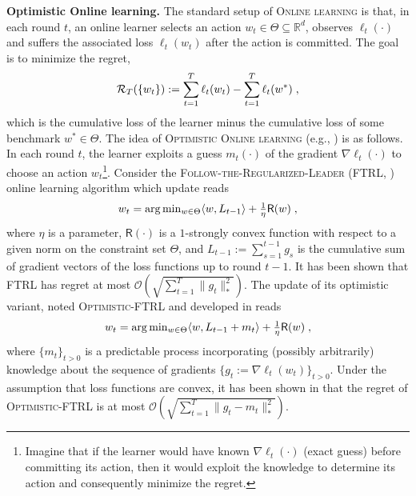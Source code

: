 \documentclass[twoside]{article}
\begin{document}
\textbf{Optimistic Online learning.}\hspace{0.1cm}
The standard setup of \textsc{Online learning} is that, in each round $t$, an online learner selects an action $w_{t} \in \Theta \subseteq \mathbb R^{d}$, observes $\ell_{t}(\cdot)$ and suffers the associated loss $\ell_{t}(w_t)$ after the action is committed.
The goal is to minimize the regret, 
$$\mathcal{R}_{T}( \{ w_t \} ):= \sum_{t=1}^T \ell_{t}(w_t) - \sum_{t=1}^T \ell_{t}(w^*)\;,$$
which is the cumulative loss of the learner minus the cumulative loss of some benchmark $w^{*} \in \Theta$.
The idea of \textsc{Optimistic Online learning} (e.g., \citep{CJ12,RS13b,SALS15,ALLW18}) is as follows.
In each round $t$, the learner exploits a guess $m_t(\cdot)$ of the gradient $\nabla \ell_t(\cdot)$ to choose an action $w_t$\footnote{Imagine that if the learner would have known $\nabla \ell_t(\cdot)$ (\ie exact guess) before committing its action, then it would exploit the knowledge to determine its action and consequently minimize the regret.}. 
Consider the \textsc{Follow-the-Regularized-Leader} (\textsc{FTRL}, \citep{H14}) online learning algorithm which update reads
\begin{equation} \notag
\textstyle w_t  = \arg \min_{w \in \Theta} \langle w , L_{t-1} \rangle + \frac{1}{\eta} \textsf{R}(w) \;,
\end{equation}
where $\eta$ is a parameter, $\textsf{R}(\cdot)$ is a $1$-strongly convex function with respect to a given norm on the constraint set $\Theta$, and $L_{t-1}:= \sum_{s=1}^{t-1} g_s$ is the cumulative sum of gradient vectors of the loss functions up to round $t-1$. It has been shown that FTRL has regret at most $\mathcal{O}(\sqrt{\sum_{t=1}^T \| g_t \|_*^2})$.
The update of its optimistic variant, noted \textsc{Optimistic-FTRL} and developed in \citep{SALS15} reads
\begin{equation} \label{optFTRL}
\textstyle w_t  = \arg \min_{w \in \Theta} \langle w , L_{t-1} + m_t \rangle + \frac{1}{\eta} \textsf{R}(w)\;,
\end{equation}
where $\{m_{t}\}_{t>0}$ is a predictable process incorporating (possibly arbitrarily) knowledge about the sequence of gradients $\{ g_{t}:=\nabla \ell_t(w_t)\}_{t>0}$.
Under the assumption that loss functions are convex, it has been shown in \citep{SALS15} that the regret of \textsc{Optimistic-FTRL} is at most $\mathcal{O}(\sqrt{\sum_{t=1}^T \| g_t - m_t \|_*^2 } )$.
\end{document}
